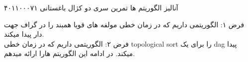 \documentclass[12pt]{article}
\begin{document}
\handout
{آنالیز الگوریتم ها}
{تمرین سری دو}
{کژال باغستانی}
{۴۰۱۱۰۰۰۷۱}

فرض ۱: الگوریتمی داریم که در زمان خطی مولفه های قویا همبند را در گراف جهت دار پیدا میکند.\\
فرض ۲: الگوریتمی داریم که در زمان خطی topological sort را برای یک dag پیدا میکند.
در ادامه این الگوریتم هارا ارائه میدهم.






\end{document}
